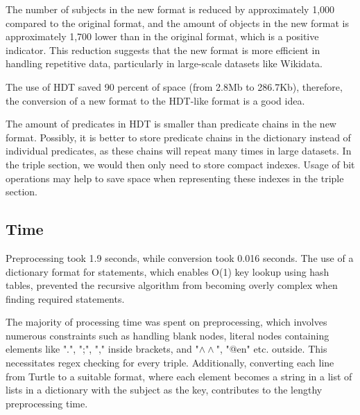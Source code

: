 The number of subjects in the new format is reduced by approximately 1,000 compared to the original format, and the amount of objects in the new format is approximately 1,700 lower than in the original format, which is a positive indicator. This reduction suggests that the new format is more efficient in handling repetitive data, particularly in large-scale datasets like Wikidata.

The use of HDT saved 90 percent of space (from 2.8Mb to 286.7Kb), therefore, the conversion of a new format to the HDT-like format is a good idea.


The amount of predicates in HDT is smaller than predicate chains in the new format. Possibly, it is better to store predicate chains in the dictionary instead of individual predicates, as these chains will repeat many times in large datasets. In the triple section, we would then only need to store compact indexes. Usage of bit operations may help to save space when representing these indexes in the triple section.

\subsection{Time}

Preprocessing took 1.9 seconds, while conversion took 0.016 seconds. The use of a dictionary format for statements, which enables O(1) key lookup using hash tables, prevented the recursive algorithm from becoming overly complex when finding required statements.

The majority of processing time was spent on preprocessing, which involves numerous constraints such as handling blank nodes, literal nodes containing elements like ".", ";", "," inside brackets, and "$\wedge\wedge$", "@en" etc. outside. This necessitates regex checking for every triple. Additionally, converting each line from Turtle to a suitable format, where each element becomes a string in a list of lists in a dictionary with the subject as the key, contributes to the lengthy preprocessing time.

